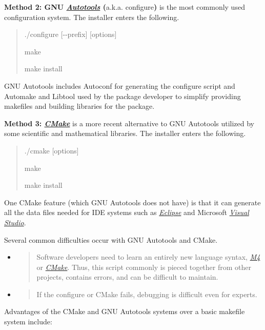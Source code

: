 \documentclass[]{article}
\begin{document}
\textbf{Method 2: GNU
\href{https://en.wikipedia.org/wiki/GNU_build_system}{\emph{Autotools}}
(}a.k.a. configure\textbf{)} is the most commonly used configuration
system. The installer enters the following.

\begin{quote}
./configure {[}-\/-prefix{]} {[}options{]}

make

make install
\end{quote}
GNU Autotools includes Autoconf for generating the configure script and
Automake and Libtool used by the package developer to simplify providing
makefiles and building libraries for the package.

\textbf{Method 3: \href{http://cmake.org}{\emph{CMake}}} is a more
recent alternative to GNU Autotools utilized by some scientific and
mathematical libraries. The installer enters the following.

\begin{quote}
./cmake {[}options{]}

make

make install
\end{quote}
One CMake feature (which GNU Autotools does not have) is that it can
generate all the data files needed for IDE systems such as
\href{http://eclipse}{\emph{Eclipse}} and Microsoft
\href{https://www.visualstudio.com/}{\emph{Visual Studio}}.

Several common difficulties occur with GNU Autotools and CMake.

\begin{itemize}
\item
  \begin{quote}
  Software developers need to learn an entirely new language syntax,
  \href{http://pubs.opengroup.org/onlinepubs/9699919799/utilities/m4.html}{\emph{M4}}
  or
  \href{https://cmake.org/cmake/help/v3.0/manual/cmake-language.7.html\#syntax}{\emph{CMake}}.
  Thus, this script commonly is pieced together from other projects,
  contains errors, and can be difficult to maintain.
  \end{quote}
\item
  \begin{quote}
  If the configure or CMake fails, debugging is difficult even for
  experts.
  \end{quote}
\end{itemize}

Advantages of the CMake and GNU Autotools systems over a basic makefile
system include:
\end{document}
